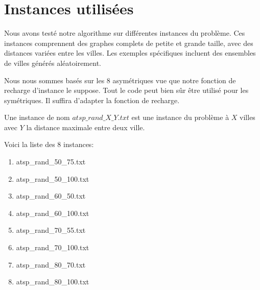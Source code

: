 \section{Instances utilisées}

Nous avons testé notre algorithme sur différentes instances du problème. Ces instances comprennent des graphes complets de petite et grande taille, avec des distances variées entre les villes. Les exemples spécifiques incluent des ensembles de villes générés aléatoirement.
\newline

Nous nous sommes basés sur les 8 asymétriques vue que notre fonction de recharge d'instance le suppose. Tout le code peut bien sûr être utilisé pour les symétriques. Il suffira d'adapter la fonction de recharge. 
\newline

Une instance de nom $atsp\_rand\_X\_Y.txt$ est une instance du problème à $X$ villes avec $Y$ la distance maximale entre deux ville.
\newline

Voici la liste des 8 instances:

\begin{enumerate}
	\item atsp\_rand\_50\_75.txt
	\item atsp\_rand\_50\_100.txt
	\item atsp\_rand\_60\_50.txt
	\item atsp\_rand\_60\_100.txt
	\item atsp\_rand\_70\_55.txt
	\item atsp\_rand\_70\_100.txt
	\item atsp\_rand\_80\_70.txt
	\item atsp\_rand\_80\_100.txt
\end{enumerate}